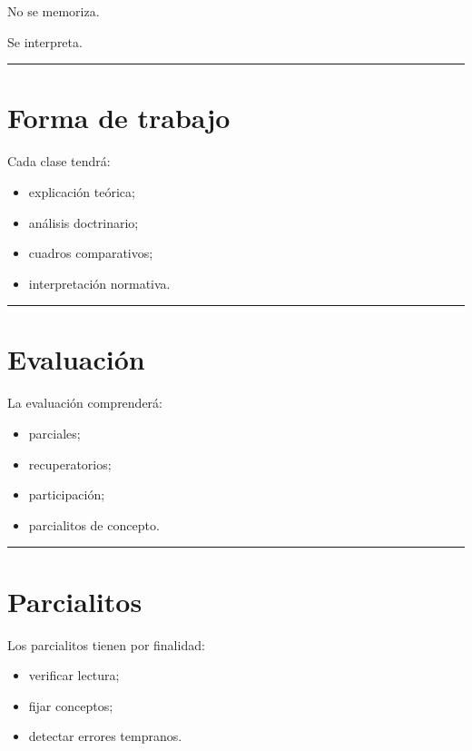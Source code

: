 \documentclass[
  spanish,
  letterpaper,
  DIV=11,
  numbers=noendperiod]{scrartcl}
\providecommand{\tightlist}{%
  \setlength{\itemsep}{0pt}\setlength{\parskip}{0pt}}
\begin{document}
No se memoriza.

Se interpreta.

\begin{center}\rule{0.5\linewidth}{0.5pt}\end{center}

\section{Forma de trabajo}\label{forma-de-trabajo}

Cada clase tendrá:

\begin{itemize}
\tightlist
\item
  explicación teórica;
\item
  análisis doctrinario;
\item
  cuadros comparativos;
\item
  interpretación normativa.
\end{itemize}

\begin{center}\rule{0.5\linewidth}{0.5pt}\end{center}

\section{Evaluación}\label{evaluaciuxf3n}

La evaluación comprenderá:

\begin{itemize}
\tightlist
\item
  parciales;
\item
  recuperatorios;
\item
  participación;
\item
  parcialitos de concepto.
\end{itemize}

\begin{center}\rule{0.5\linewidth}{0.5pt}\end{center}

\section{Parcialitos}\label{parcialitos}

Los parcialitos tienen por finalidad:

\begin{itemize}
\tightlist
\item
  verificar lectura;
\item
  fijar conceptos;
\item
  detectar errores tempranos.
\end{itemize}
\end{document}
